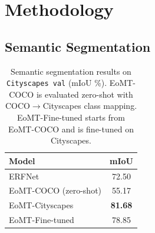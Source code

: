\section{Methodology}
\label{sec:method}

\subsection{Semantic Segmentation}
\begin{table}[!htbp]
\centering
\small
\caption{Semantic segmentation results on \texttt{Cityscapes val} (mIoU \%). 
EoMT-COCO is evaluated zero-shot with COCO$\rightarrow$Cityscapes class mapping. 
EoMT-Fine-tuned starts from EoMT-COCO and is fine-tuned on Cityscapes.}
\label{tab:semseg}
\begin{tabular}{lc}
\toprule
Model & mIoU \\
\midrule
ERFNet                  & 72.50 \\
EoMT-COCO (zero-shot)   & 55.17 \\
EoMT-Cityscapes         & \textbf{81.68} \\
EoMT-Fine-tuned         & 78.85 \\
\bottomrule
\end{tabular}
\end{table}

